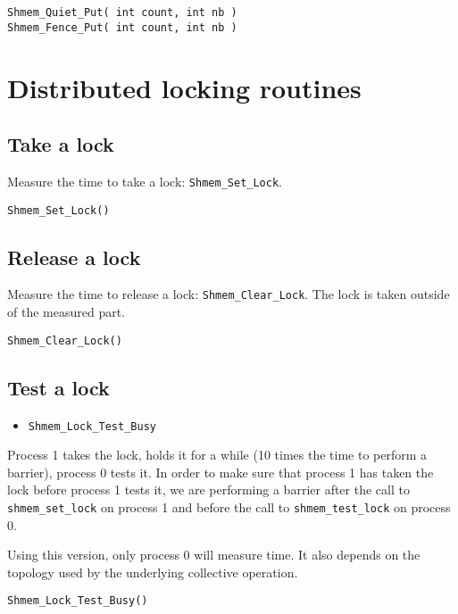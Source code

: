 \documentclass[12pt, letterpaper]{article}
\begin{document}
\begin{lstlisting}
Shmem_Quiet_Put( int count, int nb )
Shmem_Fence_Put( int count, int nb )
\end{lstlisting}

\section{Distributed locking routines}

\subsection{Take a lock}

Measure the time to take a lock: {\tt Shmem\_Set\_Lock}.

\begin{lstlisting}
Shmem_Set_Lock()
\end{lstlisting}

\subsection{Release a lock}

Measure the time to release a lock: {\tt Shmem\_Clear\_Lock}. The lock is taken outside of the measured part.

\begin{lstlisting}
Shmem_Clear_Lock()
\end{lstlisting}

\subsection{Test a lock}
 
\begin{itemize}
    \item {\tt Shmem\_Lock\_Test\_Busy}
\end{itemize}

Process 1 takes the lock, holds it for a while (10 times the time to perform a barrier),  process 0 tests it. In order to make sure that process 1 has taken the lock before process 1 tests it, we are performing a barrier after the call to {\tt shmem\_set\_lock} on process 1 and before the call to {\tt shmem\_test\_lock} on process 0.

Using this version, only process 0 will measure time. It also depends on the topology used by the underlying collective operation.

\begin{lstlisting}
Shmem_Lock_Test_Busy()
\end{lstlisting}
\end{document}
